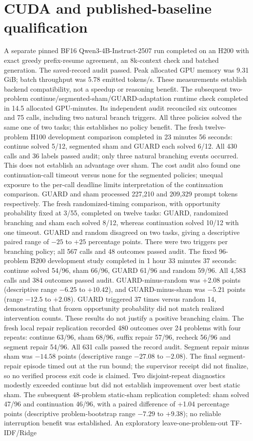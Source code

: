 \documentclass[11pt]{article}
\begin{document}
\section{CUDA and published-baseline qualification}
A separate pinned BF16 Qwen3-4B-Instruct-2507 run completed on an H200 with exact greedy prefix-resume agreement, an 8k-context check and batched generation. The saved-record audit passed. Peak allocated GPU memory was 9.31 GiB; batch throughput was 5.78 emitted tokens/s. These measurements establish backend compatibility, not a speedup or reasoning benefit. The subsequent two-problem continue/segmented-sham/GUARD-adaptation runtime check completed in 14.5 allocated GPU-minutes. Its independent audit reconciled six outcomes and 75 calls, including two natural branch triggers. All three policies solved the same one of two tasks; this establishes no policy benefit. The fresh twelve-problem H100 development comparison completed in 23 minutes 56 seconds: continue solved 5/12, segmented sham and GUARD each solved 6/12. All 430 calls and 36 labels passed audit; only three natural branching events occurred. This does not establish an advantage over sham. The cost audit also found one continuation-call timeout versus none for the segmented policies; unequal exposure to the per-call deadline limits interpretation of the continuation comparison. GUARD and sham processed 227,210 and 209,329 prompt tokens respectively. The fresh randomized-timing comparison, with opportunity probability fixed at 3/55, completed on twelve tasks: GUARD, randomized branching and sham each solved 8/12, whereas continuation solved 10/12 with one timeout. GUARD and random disagreed on two tasks, giving a descriptive paired range of $-25$ to $+25$ percentage points. There were two triggers per branching policy; all 567 calls and 48 outcomes passed audit. The fixed 96-problem B200 development study completed in 1 hour 33 minutes 37 seconds: continue solved 54/96, sham 66/96, GUARD 61/96 and random 59/96. All 4,583 calls and 384 outcomes passed audit. GUARD-minus-random was +2.08 points (descriptive range $-6.25$ to $+10.42$), and GUARD-minus-sham was $-5.21$ points (range $-12.5$ to $+2.08$). GUARD triggered 37 times versus random 14, demonstrating that frozen opportunity probability did not match realized intervention counts. These results do not justify a positive branching claim. The fresh local repair replication recorded 480 outcomes over 24 problems with four repeats: continue 63/96, sham 68/96, suffix repair 57/96, recheck 56/96 and segment repair 54/96. All 631 calls passed the record audit. Segment repair minus sham was $-14.58$ points (descriptive range $-27.08$ to $-2.08$). The final segment-repair episode timed out at the run bound; the supervisor receipt did not finalize, so no verified process exit code is claimed. Two disjoint-repeat diagnostics modestly exceeded continue but did not establish improvement over best static sham. The subsequent 48-problem static-sham replication completed: sham solved 47/96 and continuation 46/96, with a paired difference of +1.04 percentage points (descriptive problem-bootstrap range $-7.29$ to $+9.38$); no reliable interruption benefit was established. An exploratory leave-one-problem-out TF-IDF/Ridge 
\end{document}
